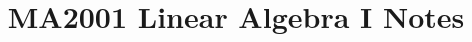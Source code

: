 \documentclass[a4paper, 12pt, fleqn]{book}
\begin{document}
\title{MA2001 Linear Algebra I Notes}
\date{}
\maketitle

\tableofcontents








\end{document}
